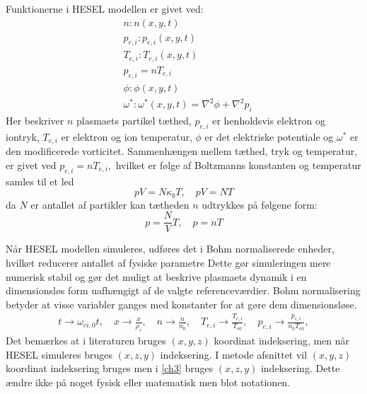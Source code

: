 Funktionerne i HESEL modellen er givet ved:
\begin{align}
    &n: n(x,y,t) \label{foo: tætheds funktionen}\\
    &p_{e,i}: p_{e,i}(x,y,t) \label{foo: tryk funktionen}\\
    &T_{e,i}: T_{e,i}(x,y,t) \label{foo: temperatur funktionen}\\
    &p_{e,i} = nT_{e,i} \label{eq: tryk temperatur sammenhængen}\\
    &\phi: \phi(x,y,t) \label{foo: phi funktionen}\\
    &\omega^*: \omega^*(x,y,t) = \nabla^2\phi + \nabla^2 p_i \label{eq: vorticitet funktionen}
\end{align}
Her beskriver $n$ plasmaets partikel tæthed, $p_{e,i}$ er henholdsvis elektron og iontryk, $T_{e,i}$ er elektron og ion temperatur, $\phi$ er det elektriske potentiale og $\omega^*$ er den modificerede vorticitet.
Sammenhængen mellem tæthed, tryk og temperatur, er givet ved $p_{e,i} = nT_{e,i},$ hvilket er følge af Boltzmanns konstanten og temperatur samles til et led 
\begin{equation*}
    pV =N \kappa_b T,\quad pV = NT
\end{equation*}
da $N$ er antallet af partikler kan tætheden $n$ udtrykkes på følgene form:
\begin{equation*}
    p = \frac{N}{V}T,\quad p = nT
\end{equation*}

Når HESEL modellen simuleres, udføres det i Bohm normaliserede enheder, hvilket reducerer antallet af fysiske parametre 
Dette gør simuleringen mere numerisk stabil og gør det muligt at beskrive plasmaets dynamik i en dimensionsløs form uafhængigt af de valgte referenceværdier.
Bohm normalisering betyder at visse variabler ganges med konstanter for at gøre dem dimensionsløse.
\begin{align*}
    t \rightarrow \omega_{ci,0} t,\quad
    x \rightarrow \frac{x}{\rho_s}, \quad
    n \rightarrow \frac{n}{n_0}, \quad
    T_{e,i} \rightarrow \frac{T_{e,i}}{T_{e0}}, \quad
    p_{e,i} \rightarrow \frac{p_{e,i}}{n_0T_{e0}},
\end{align*}
Det bemærkes at i literaturen bruges $(x,y,z)$ koordinat indeksering, men når HESEL simuleres bruges $(x,z,y)$ indeksering.
I metode afsnittet vil $(x,y,z)$ koordinat indeksering bruges men i \ref{ch3} bruges $(x,z,y)$ indeksering. Dette ændre ikke på noget fysisk eller matematisk men blot notationen.

